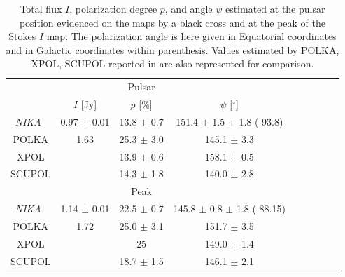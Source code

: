 \documentclass[twocolumn,traditabstract]{aa}
\def\NIKA{\textit{NIKA}}
\begin{document}
 \begin{table}
  \centering
      \begin{tabular}{ccccccccc}
      \hline
      \hline
      & &  Pulsar & & \\
       & $I$ [Jy]& $p$ [\%] & $\psi$ [$^\circ$] \\ 
       \hline
      \NIKA\ & 0.97 $\pm$ 0.01 & 13.8 $\pm$ 0.7 & 151.4 $\pm$ 1.5 $\pm$ 1.8 (-93.8)&\\
                                         
      POLKA & 1.63 & 25.3 $\pm$ 3.0 & 145.1 $\pm$ 3.3 & \\
      XPOL  & & 13.9 $\pm$ 0.6 & 158.1 $\pm$ 0.5 &  \\
      SCUPOL & & 14.3 $\pm$ 1.8 & 140.0 $\pm$ 2.8& \\
      \hline
      \hline
       & &  Peak & & \\
       \hline
        \NIKA\ &1.14 $\pm$ 0.01 & 22.5 $\pm$ 0.7 & 145.8 $\pm$ 0.8 $\pm$ 1.8 (-88.15)\\                                        
      POLKA & 1.72 & 25.0 $\pm$ 3.1 & 151.7 $\pm$ 3.5 &  \\
      XPOL  & & 25 & 149.0 $\pm $ 1.4 &  \\
      SCUPOL & & 18.7 $\pm$ 1.5 & 146.1 $\pm$ 2.1&\\
  
     \hline            
    \hline   
    \end{tabular}
   \caption{ 
   	Total flux $I$, polarization degree $p$, and angle $\psi$ estimated at the pulsar position evidenced on the maps by a black cross and at the peak of the Stokes $I$ map. The polarization angle is here given in Equatorial coordinates and in Galactic coordinates within parenthesis.
   	Values estimated by POLKA, XPOL, SCUPOL reported in \cite{2014PASP..126.1027W} are also represented for comparison. 
    }
    \label{tab:crab_comparison}
 \end{table}
  
\end{document}
